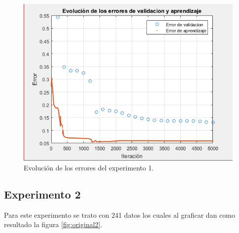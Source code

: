 \begin{figure}[H]
    \begin{center}
        \includegraphics[width=16cm]{1/error.png}
        \caption{Evolución de los errores del experimento 1.}
        \label{fig:error1}
    \end{center}
\end{figure}
\newpage

\subsection{Experimento 2}
Para este experimento se trato con 241 datos los cuales al graficar dan como resultado la figura \ref{fig:original2}.

